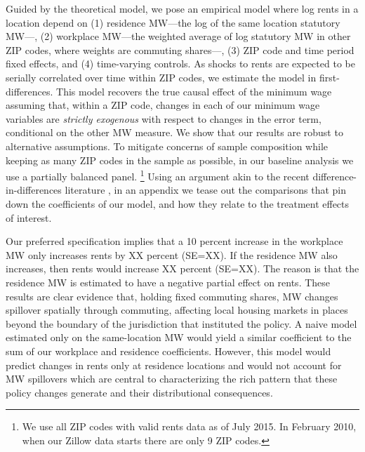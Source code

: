 Guided by the theoretical model, we pose an empirical model where log rents in 
a location depend on
(1) residence MW---the log of the same location statutory MW---,
(2) workplace MW---the weighted average of log statutory MW in other ZIP codes,
where weights are commuting shares---,
(3)  ZIP code and time period fixed effects,
and 
(4) time-varying controls.
As shocks to rents are expected to be serially correlated over time within ZIP codes, 
we estimate the model in first-differences.
This model recovers the true causal effect of the minimum wage assuming that, 
within a ZIP code, changes in each of our minimum wage variables are 
\textit{strictly exogenous} with respect to changes in the error term, conditional
on the other MW measure.
We show that our results are robust to alternative assumptions.
To mitigate concerns of sample composition while keeping as many ZIP codes in the 
sample as possible, in our baseline analysis we use a partially balanced panel.%
\footnote{We use all ZIP codes with valid rents data as of July 2015. 
In February 2010, when our Zillow data starts there are only 9 ZIP codes.}
Using an argument akin to the recent difference-in-differences literature
\parencite[e.g.,][]{CallawaySantAnna2021,CallawayEtAl2021}, 
in an appendix we tease out the comparisons that pin down the coefficients of our 
model, and how they relate to the treatment effects of interest.


Our preferred specification implies that a 10 percent increase in the workplace MW
only increases rents by XX percent (SE=XX).
If the residence MW also increases, then rents would increase XX percent (SE=XX).
The reason is that the residence MW is estimated to have a negative partial effect
on rents.
These results are clear evidence that, holding fixed commuting shares, MW changes 
spillover spatially through commuting, affecting local housing markets in places
beyond the boundary of the jurisdiction that instituted the policy.
A naive model estimated only on the same-location MW would yield a similar coefficient
to the sum of our workplace and residence coefficients.
However, this model would predict changes in rents only at residence locations and 
would not account for MW spillovers which are central to characterizing the rich pattern
that these policy changes generate and their distributional consequences. 

